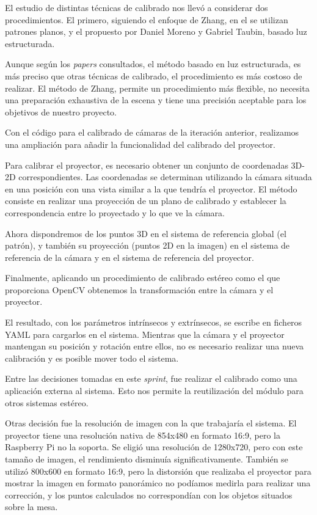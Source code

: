 El estudio de distintas técnicas de calibrado nos llevó a considerar dos procedimientos. El primero, siguiendo el enfoque de Zhang, en el se utilizan patrones planos, y el propuesto por Daniel Moreno y Gabriel Taubin, basado luz estructurada.

Aunque según los \textit{papers} consultados, el método basado en luz estructurada, es más preciso que otras técnicas de calibrado, el procedimiento es más costoso de realizar. El método de Zhang, permite un procedimiento más flexible, no necesita una preparación exhaustiva de la escena y tiene una precisión aceptable para los objetivos de nuestro proyecto.

Con el código para el calibrado de cámaras de la iteración anterior, realizamos una ampliación para añadir la funcionalidad del calibrado del proyector.

Para calibrar el proyector, es necesario obtener un conjunto de coordenadas 3D-2D correspondientes. Las coordenadas se determinan utilizando la cámara situada en una posición con una vista similar a la que tendría el proyector. El método consiste en realizar una proyección de un plano de calibrado y establecer la correspondencia entre lo proyectado y lo que ve la cámara.
 
Ahora dispondremos de los puntos 3D en el sistema de referencia global (el patrón), y también su proyección (puntos 2D en la imagen) en el sistema de referencia de la cámara y en el sistema de referencia del proyector. 

Finalmente, aplicando un procedimiento de calibrado estéreo como el que proporciona OpenCV obtenemos la transformación entre la cámara y el proyector.

El resultado, con los parámetros intrínsecos y extrínsecos, se escribe en ficheros YAML para cargarlos en el sistema. Mientras que la cámara y el proyector mantengan su posición y rotación entre ellos, no es necesario realizar una nueva calibración y es posible mover todo el sistema.  

Entre las decisiones tomadas en este \textit{sprint}, fue realizar el calibrado como una aplicación externa al sistema. Esto nos permite la reutilización del módulo para otros sistemas estéreo.

Otras decisión fue la resolución de imagen con la que trabajaría el sistema. El proyector tiene una resolución nativa de 854x480 en formato 16:9, pero la Raspberry Pi no la soporta. Se eligió una resolución de 1280x720, pero con este tamaño de imagen, el rendimiento disminuía significativamente. También se utilizó 800x600 en formato 16:9, pero la distorsión que realizaba el proyector para mostrar la imagen en formato panorámico no podíamos medirla para realizar una corrección, y los puntos calculados no correspondían con los objetos situados sobre la mesa.

